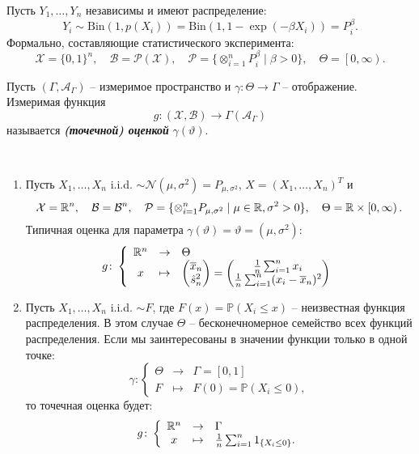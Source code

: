 \begin{exmp}
	Пусть $Y_1, \dots, Y_n$ независимы и имеют распределение:
	\[Y_i \sim \mathrm{Bin}(1, p(X_i))=\mathrm{Bin}(1, 1-\exp(-\beta X_i))=P_i^{\beta}.\]
	Формально, составляющие статистического эксперимента:
	\[ \mathcal{X}=\{ 0, 1 \}^n, \quad \mathcal{B}=\mathcal{P(X)}, \quad \mathcal{P}=\{\otimes_{i=1}^nP_i^{\beta} \mid \beta>0 \}, \quad \Theta=\left[0, \infty\right).  \]
\end{exmp}

\begin{defn}
	Пусть $(\Gamma, \mathcal{A}_\Gamma)$ -- измеримое пространство и $\gamma\colon \Theta \rightarrow \Gamma$ -- отображение. Измеримая функция
	\[g\colon(\mathcal{X}, \mathcal{B}) \rightarrow \Gamma(\mathcal{A}_\Gamma)  \]
	называется \textbf{\textit{(точечной) оценкой}} $\gamma(\vartheta)$.
\end{defn}

\begin{exmp} \label{exmp2.7}\
	
	\begin{enumerate}
		\item Пусть $X_1, \dots , X_n$ i.i.d. $\sim \mathcal{N}(\mu, \sigma^2)=P_{\mu, \sigma^2}$, $X=(X_1, \dots , X_n)^T$ и
		\[\mathcal{X}=\mathbb{R}^n, \quad \mathcal{B}=\mathcal{B}^n, \quad \mathcal{P}=\{\otimes_{i=1}^nP_{\mu, \sigma^2} \mid \mu \in \mathbb{R}, \sigma^2>0 \}, \quad \Theta=\mathbb{R} \times \left[0, \infty\right).\]
		Типичная оценка для параметра $\gamma(\vartheta)=\vartheta=(\mu, \sigma^2)$:
		\[ g \colon
		\left \{
		\begin{array}{ccl}
		\mathbb{R}^n & \rightarrow & \Theta \\
		x & \mapsto &\begin{pmatrix} \overline{x}_n \\ \hat{s}_n^2 \end{pmatrix} = \begin{pmatrix} \frac{1}{n} \sum_{i=1}^n x_i \\ \frac{1}{n} \sum_{i=1}^n (x_i-\overline{x}_n)^2 \end{pmatrix}
		\end{array}
		\right.
		\]
		\item Пусть $X_1, \dots , X_n$ i.i.d. $\sim F$, где $F(x)=\mathbb{P}(X_i \leq x)$ -- неизвестная функция распределения. В этом случае $\Theta$ -- бесконечномерное семейство всех функций распределения. Если мы заинтересованы в значении функции только в одной точке:
		\[ \gamma \colon
		\left \{
		\begin{array}{ccl}
		\Theta & \rightarrow & \Gamma=\left[0,1\right] \\
		F & \mapsto & F(0)=\mathbb{P}(X_i \leq 0),
		\end{array}
		\right.
		\]
		то точечная оценка будет:
		\[ g \colon
		\left \{
		\begin{array}{ccl}
		\mathbb{R}^n & \rightarrow & \Gamma \\
		x & \mapsto & \frac{1}{n} \sum_{i=1}^n 1_{\{X_i \leq 0\}}.
		\end{array}
		\right.
		\]
	\end{enumerate}
\end{exmp}

